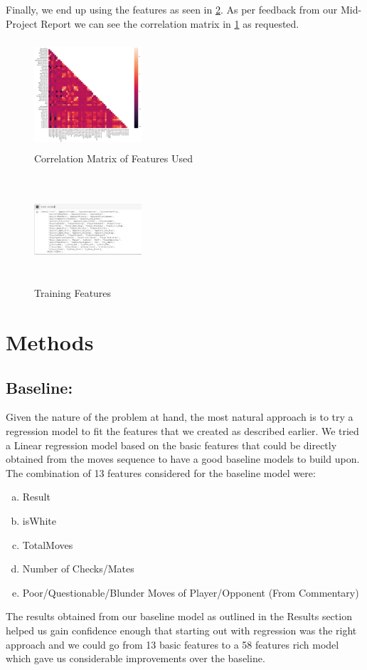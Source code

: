 \documentclass[11pt,a4paper]{article}
\begin{document}
Finally, we end up using the features as seen in \ref{fig:TrainingColumns}. As per feedback from our Mid-Project Report we can see the correlation matrix in \ref{fig:Correlation} as requested.

\begin{figure}
	\centering
	\includegraphics[width=4cm,height=4cm]{correlation.jpeg}
	\caption{Correlation Matrix of Features Used}
    \label{fig:Correlation}
\end{figure}
	
\begin{figure}
	\centering
	\includegraphics[width=4cm,height=4cm,keepaspectratio]{Columns.jpeg}
    \caption{Training Features}
    \label{fig:TrainingColumns}
\end{figure}
        
\section{Methods}
\subsection{Baseline:}
    Given the nature of the problem at hand, the most natural approach is to try a regression model to fit the features that we created as described earlier. We tried a Linear regression model based on the basic features that could be directly obtained from the moves sequence to have a good baseline models to build upon. \\The combination of 13 features considered for the baseline model were:
\begin{enumerate} [(a)]
    \item Result
    \item isWhite
    \item TotalMoves
    \item Number of Checks/Mates
    \item Poor/Questionable/Blunder Moves of Player/Opponent (From Commentary)
\end{enumerate}
The results obtained from our baseline model as outlined in the Results section helped us gain confidence enough that starting out with regression was the right approach and we could go from 13 basic features to a 58 features rich model which gave us considerable improvements over the baseline.
\end{document}
